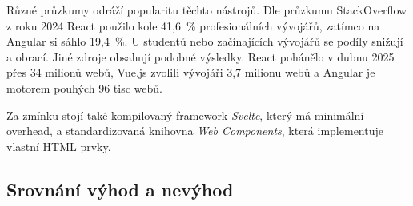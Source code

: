 Různé průzkumy odráží popularitu těchto nástrojů. Dle průzkumu StackOverflow
z roku 2024 React použilo kole 41,6~\% profesionálních vývojářů, zatímco
na Angular si sáhlo 19,4~\%. U studentů nebo začínajících vývojářů se podíly
snižují a obrací. %
Jiné zdroje obsahují podobné výsledky. React pohánělo v dubnu 2025
přes 34 milionů webů, Vue.js zvolili vývojáři 3,7 milionu webů a Angular
je motorem pouhých 96 tisc webů. %

Za zmínku stojí také kompilovaný framework \emph{Svelte}, který
má minimální overhead, a standardizovaná knihovna \emph{Web Components},
která implementuje vlastní HTML prvky.

\subsection{Srovnání výhod a nevýhod}

